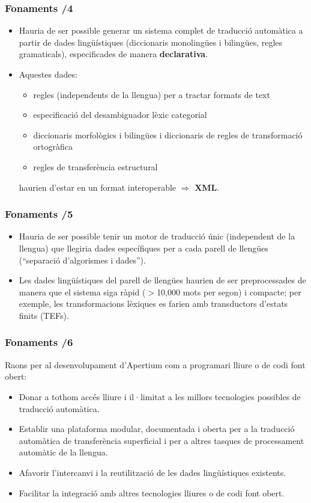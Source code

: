 \documentclass{beamer}
\begin{document}
\begin{frame}
  \frametitle{Fonaments /4}
  
\begin{itemize}
  
\item Hauria de ser possible generar un sistema complet de traducció
  automàtica a partir de dades lingüístiques (diccionaris monolingües
  i bilingües, regles gramaticals), especificades de manera
  \textbf{declarativa}.
\item Aquestes dades: 
\begin{itemize}
\item regles (independents de la llengua) per a tractar formats de text
\item especificació del desambiguador lèxic categorial
\item diccionaris morfològics i bilingües i diccionaris de regles de transformació ortogràfica
\item regles de transferència estructural
\end{itemize}
haurien d'estar en un format interoperable  $\Rightarrow$ \textbf{XML}.
  
\end{itemize}

\end{frame}
\begin{frame}
  \frametitle{Fonaments /5}
  
\begin{itemize}
  
\item Hauria de ser possible tenir un motor de traducció únic (independent de la llengua) que llegiria dades específiques per a cada parell de llengües
  (``separació d'algorismes i dades'').
\item Les dades lingüístiques del parell de llengües haurien de ser preprocessades de manera que el sistema siga ràpid ($>$10,000 mots per segon) i compacte; per exemple, les transformacions lèxiques es farien amb transductors d'estats finits
  (TEFs).
\end{itemize}

\end{frame}
\begin{frame}
  \frametitle{Fonaments /6}
  
  Raons per al desenvolupament d'Apertium com a programari lliure o de codi font obert:
\begin{itemize}
\item Donar a tothom accés lliure i il·limitat a les millors tecnologies possibles de traducció automàtica.
\item Establir una plataforma modular, documentada i oberta per a la traducció automàtica de transferència superficial i per a altres tasques de processament automàtic de la llengua.
\item Afavorir l'intercanvi i la reutilització de les dades lingüístiques existents.
\item Facilitar la integració amb altres tecnologies lliures o de codi font obert.
\end{itemize}

\end{frame}
\end{document}
